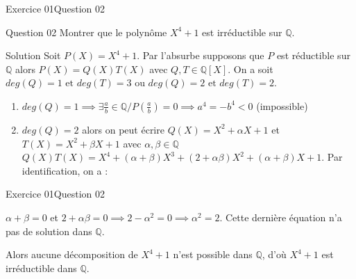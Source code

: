 \documentclass[10pt]{beamer}
\begin{document}
    \begin{frame}{Exercice 01}{Question 02}
        \begin{alertblock}{Question 02}
            Montrer que le polynôme $X^4 + 1$ est irréductible sur $\mathbb{Q}$.
        \end{alertblock}
        \begin{exampleblock}{Solution}
            Soit $P(X) = X^4 + 1$. Par l'absurbe supposons que $P$ est réductible sur $\mathbb{Q}$ alors $P(X) = Q(X)T(X)$ avec $Q, T \in \mathbb{Q}[X]$. On a soit 
             $deg(Q) = 1 \text{ et } deg(T) = 3$ ou $deg(Q) = 2 \text{ et } deg(T) = 2$. \pause
             \begin{enumerate}
                 \item $deg(Q) = 1 \implies \exists \frac{a}{b} \in \mathbb{Q} / P(\frac{a}{b}) = 0 \implies a^4 = - b^4 < 0$ (impossible) \pause
                 \item $deg(Q) = 2$ alors on peut écrire $Q(X) = X^2 + \alpha X + 1$ et $T(X) = X^2 + \beta X + 1$ avec $\alpha, \beta \in \mathbb{Q}$
                        $Q(X)T(X) = X^4 + (\alpha + \beta)X^3 + (2 + \alpha\beta)X^2 + (\alpha + \beta)X + 1$. Par identification, on a :  
            \end{enumerate}
        \end{exampleblock}
    \end{frame}

    \begin{frame}{Exercice 01}{Question 02}
        \begin{exampleblock}{}
            $\alpha + \beta = 0$ et $2 + \alpha\beta = 0 \implies 2 - \alpha^2 = 0 \implies \alpha^2 = 2$. Cette dernière équation n'a pas de solution dans 
            $\mathbb{Q}$.\\ \pause
            
            Alors aucune décomposition de $X^4 + 1$ n'est possible dans $\mathbb{Q}$, d'où $X^4 + 1$ est irréductible dans $\mathbb{Q}$.
        \end{exampleblock}
    \end{frame}
\end{document}
